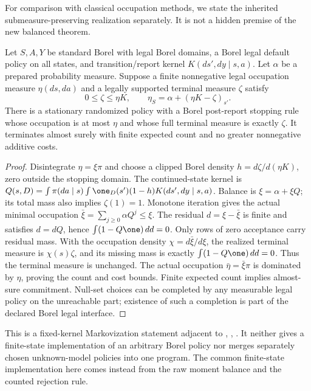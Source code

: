 For comparison with classical occupation methods, we state the inherited submeasure-preserving realization separately. It is not a hidden premise of the new balanced theorem.

\begin{proposition}\label{prop:flow}
Let $S,A,Y$ be standard Borel with legal Borel domains, a Borel legal default policy on all states, and transition/report kernel $K(ds',dy\mid s,a)$. Let $\alpha$ be a prepared probability measure. Suppose a finite nonnegative legal occupation measure $\eta(ds,da)$ and a legally supported terminal measure $\zeta$ satisfy
\[
 0\le\zeta\le\eta K,\qquad
 \eta_S=\alpha+(\eta K-\zeta)_{s'}.
\]
There is a stationary randomized policy with a Borel post-report stopping rule whose occupation is at most $\eta$ and whose full terminal measure is exactly $\zeta$. It terminates almost surely with finite expected count and no greater nonnegative additive costs.
\end{proposition}
\begin{proof}
Disintegrate $\eta=\xi\pi$ and choose a clipped Borel density $h=d\zeta/d(\eta K)$, zero outside the stopping domain. The continued-state kernel is
$Q(s,D)=\int\pi(da\mid s)\int\one_D(s')(1-h)K(ds',dy\mid s,a)$.
Balance is $\xi=\alpha+\xi Q$; its total mass also implies $\zeta(1)=1$. Monotone iteration gives the actual minimal occupation $\bar\xi=\sum_{j\ge0}\alpha Q^j\le\xi$. The residual $d=\xi-\bar\xi$ is finite and satisfies $d=dQ$, hence $\int(1-Q\one)\,dd=0$. Only rows of zero acceptance carry residual mass. With the occupation density $\chi=d\bar\xi/d\xi$, the realized terminal measure is $\chi(s)\zeta$, and its missing mass is exactly $\int(1-Q\one)\,dd=0$. Thus the terminal measure is unchanged. The actual occupation $\bar\eta=\bar\xi\pi$ is dominated by $\eta$, proving the count and cost bounds. Finite expected count implies almost-sure commitment. Null-set choices can be completed by any measurable legal policy on the unreachable part; existence of such a completion is part of the declared Borel legal interface.
\end{proof}

This is a fixed-kernel Markovization statement adjacent to \cite{PZExtreme}, \cite{PZContinuity}, \cite{DPAbsorb}. It neither gives a finite-state implementation of an arbitrary Borel policy nor merges separately chosen unknown-model policies into one program. The common finite-state implementation here comes instead from the raw moment balance and the counted rejection rule.
